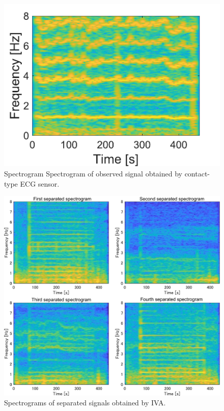 \documentclass[10.5pt]{jarticle}
\begin{document}
{%
\begin{figure}[tb]
\centering
\vspace{5pt} %
\includegraphics[width=0.7\hsize]{ecgspect.pdf}
\vspace{-10pt} %
\caption{Spectrogram Spectrogram of observed signal obtained by contact-type ECG sensor.}
\vspace{-5pt} %
\label{fig:ecgspect}
\end{figure}

\begin{figure}[tb]
\centering
\includegraphics[width=1.0\hsize]{spect_iva_64_est.pdf}
\vspace{-20pt} %
\caption{Spectrograms of separated signals obtained by IVA.}
\vspace{-20pt} %
\label{fig:siva64est}
\end{figure}

}
\end{document}
